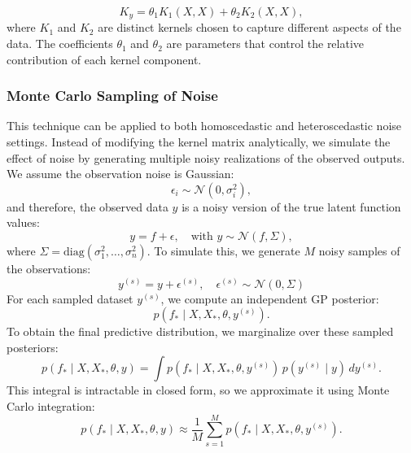 \documentclass{article}
\begin{document}
\begin{equation}
    K_y = \theta_1 K_1(X, X) + \theta_2 K_2(X, X),
    \label{eq:additive_kernel}
\end{equation}
where \( K_1 \) and \( K_2 \) are distinct kernels chosen to capture different aspects of the data. 
The coefficients \( \theta_1 \) and \( \theta_2 \) are parameters that control the relative contribution of each kernel component.

\subsubsection*{Monte Carlo Sampling of Noise}  

This technique can be applied to both homoscedastic and heteroscedastic noise settings. Instead of modifying the kernel matrix analytically, we simulate the effect of noise by generating multiple noisy realizations of the observed outputs.
\noindent
We assume the observation noise is Gaussian:
\[
\epsilon_i \sim \mathcal{N}(0, \sigma_i^2),
\]
and therefore, the observed data \( y \) is a noisy version of the true latent function values:
\[
y = f + \epsilon, \quad \text{with } y \sim \mathcal{N}(f, \Sigma),
\]
where \( \Sigma = \mathrm{diag}(\sigma_1^2, \dots, \sigma_n^2) \).
To simulate this, we generate \( M \) noisy samples of the observations:
\begin{equation}
    y^{(s)} = y + \epsilon^{(s)}, \quad \epsilon^{(s)} \sim \mathcal{N}(0, \Sigma)
\end{equation}
For each sampled dataset \( y^{(s)} \), we compute an independent GP posterior:
\begin{equation}
    p(f_* \mid X, X_*, \theta, y^{(s)}).
\end{equation}
To obtain the final predictive distribution, we marginalize over these sampled posteriors:
\begin{equation}
    p(f_* \mid X, X_*, \theta, y) = \int p(f_* \mid X, X_*, \theta, y^{(s)}) \, p(y^{(s)} \mid y) \, dy^{(s)}.
\end{equation}
This integral is intractable in closed form, so we approximate it using Monte Carlo integration:
\begin{equation}
    p(f_* \mid X, X_*, \theta, y) \approx \frac{1}{M} \sum_{s=1}^{M} p(f_* \mid X, X_*, \theta, y^{(s)}).
\end{equation}
\end{document}
